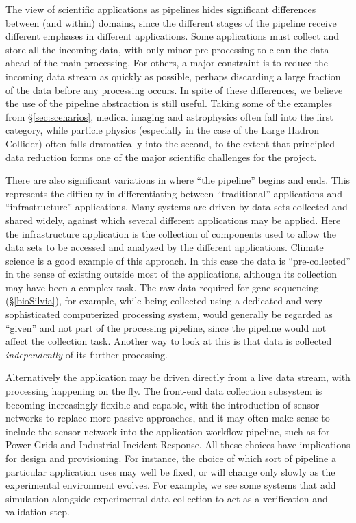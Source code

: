 The view of scientific applications as pipelines hides significant
differences between (and within) domains, since the different stages
of the pipeline receive different emphases in different
applications. Some applications must collect and store all the
incoming data, with only minor pre-processing to clean the data ahead
of the main processing. For others, a major constraint is to reduce
the incoming data stream as quickly as possible, perhaps discarding a
large fraction of the data before any processing occurs. In spite of these differences, we believe the use of the pipeline abstraction is still useful.
Taking some of the examples from
\S\ref{sec:scenarios}, medical imaging and astrophysics often fall
into the first category, while particle physics (especially in the
case of the Large Hadron Collider) often falls dramatically into the
second, to the extent that principled data reduction forms one of the
major scientific challenges for the project.

There are also significant variations in where ``the pipeline'' begins
and ends. This represents the difficulty in differentiating between ``traditional'' applications
and ``infrastructure'' applications. Many systems are driven by data sets collected and shared
widely, against which several different applications may be applied.
Here the infrastructure application is the collection of components used to allow the
data sets to be accessed and analyzed by the different applications.
Climate science is a good example of this approach. In this
case the data is ``pre-collected'' in the sense of existing outside
most of the applications, although its collection may have been a
complex task. The raw data required for gene sequencing
(\S\ref{bioSilvia}), for example, while being collected using a
dedicated and very sophisticated computerized processing system, would
generally be regarded as ``given'' and not part of the processing
pipeline, since the pipeline would not affect the collection
task. Another way to look at this is that data is collected
\emph{independently} of its further processing.

Alternatively the application may be driven directly
from a live data stream, with processing happening on the
fly. The front-end data collection subsystem is becoming increasingly
flexible and capable, with the introduction of sensor networks to
replace more passive approaches, and it may often make sense to
include the sensor network into the application workflow pipeline, such as for Power Grids and
Industrial Incident Response. All
these choices have implications for design and provisioning. For instance,
the choice of which sort of pipeline a particular application uses may
well be fixed, or will change only slowly as the experimental
environment evolves. For example, we see some systems that add simulation alongside experimental data collection to act
as a verification and validation step.

